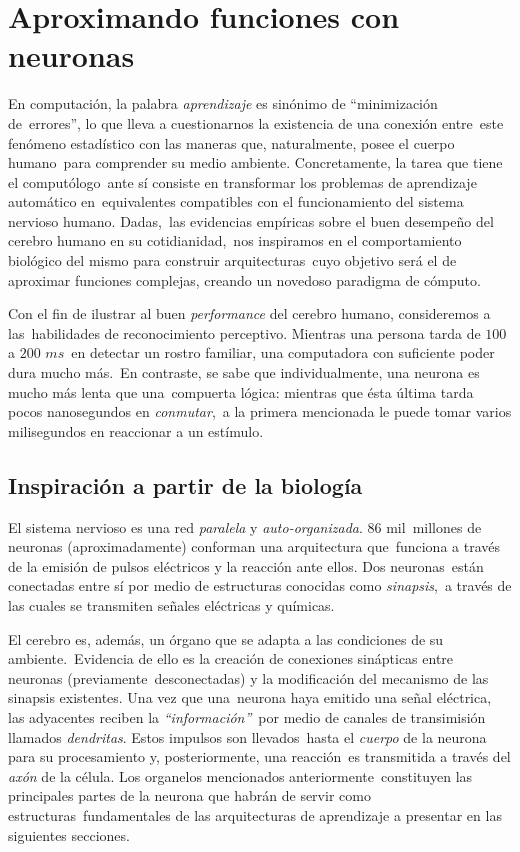 \section{Aproximando funciones con neuronas}

\noindent
En computación, la palabra \emph{aprendizaje} es sinónimo de ``minimización de\
errores'', lo que lleva a cuestionarnos la existencia de una conexión entre\
este fenómeno estadístico con las maneras que, naturalmente, posee el cuerpo humano\
para comprender su medio ambiente. Concretamente, la tarea que tiene el computólogo\
ante sí consiste en transformar los problemas de aprendizaje automático en\
equivalentes compatibles con el funcionamiento del sistema nervioso humano. Dadas,\
las evidencias empíricas sobre el buen desempeño del cerebro humano en su cotidianidad,\
nos inspiramos en el comportamiento biológico del mismo para construir arquitecturas\
cuyo objetivo será el de aproximar funciones complejas, creando un novedoso paradigma de cómputo.\par
Con el fin de ilustrar al buen \emph{performance} del cerebro humano, consideremos a las\
habilidades de reconocimiento perceptivo. Mientras una persona tarda de $100$ a $200$ $ms$\
en detectar un rostro familiar, una computadora con suficiente poder dura mucho más.\cite{haykin2009}\
En contraste, se sabe que individualmente, una neurona es mucho más lenta que una\
compuerta lógica: mientras que ésta última tarda pocos nanosegundos en \emph{conmutar},\
a la primera mencionada le puede tomar varios milisegundos en reaccionar a un estímulo.

\subsection{Inspiración a partir de la biología}

\noindent
El sistema nervioso es una red \emph{paralela} y \emph{auto-organizada}. $86$ mil\
millones de neuronas (aproximadamente) \cite{website:nature:scitable} conforman una arquitectura que\
funciona a través de la emisión de pulsos eléctricos y la reacción ante ellos. Dos neuronas\
están conectadas entre sí por medio de estructuras conocidas como \emph{sinapsis},\
a través de las cuales se transmiten señales eléctricas y químicas.\par
El cerebro es, además, un órgano que se adapta a las condiciones de su ambiente.\
Evidencia de ello es la creación de conexiones sinápticas entre neuronas (previamente\
desconectadas) y la modificación del mecanismo de las sinapsis existentes. Una vez que una\
neurona haya emitido una señal eléctrica, las adyacentes reciben la \emph{``información''}\
por medio de canales de transimisión llamados \emph{dendritas}. Estos impulsos son llevados\
hasta el \emph{cuerpo} de la neurona para su procesamiento y, posteriormente, una reacción\
es transmitida a través del \emph{axón} de la célula. Los organelos mencionados anteriormente\
constituyen las principales partes de la neurona que habrán de servir como estructuras\
fundamentales de las arquitecturas de aprendizaje a presentar en las siguientes secciones.\cite{rojas1996}

